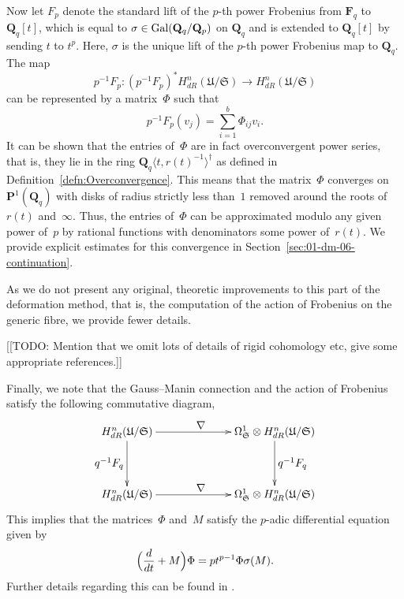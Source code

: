 Now let $F_p$ denote the standard lift of the $p$-th power Frobenius 
from $\mathbf{F}_q$ to $\mathbf{Q}_q[t]$, which is equal to 
$\sigma \in \operatorname{Gal}(\mathbf{Q}_q/\mathbf{Q}_p)$ on $\mathbf{Q}_q$ and 
is extended to $\mathbf{Q}_q[t]$ by sending $t$ to $t^p$.  Here, $\sigma$ 
is the unique lift of the $p$-th power Frobenius map to $\mathbf{Q}_q$.  
The map 
\begin{equation*}
p^{-1} F_p \colon (p^{-1} F_p)^{*} H_{dR}^{n}(\mathfrak{U}/\mathfrak{S}) 
    \to H_{dR}^{n}(\mathfrak{U}/\mathfrak{S})
\end{equation*}
can be represented by a matrix~$\Phi$ such that 
\begin{equation*}
p^{-1} F_p (v_j) = \sum_{i=1}^{b} \Phi_{ij} v_i.
\end{equation*}
It can be shown that the entries of~$\Phi$ are in fact overconvergent 
power series, that is, they lie in the ring 
$\mathbf{Q}_q\langle t, r(t)^{-1}\rangle^{\dagger}$ as defined in 
Definition~\ref{defn:Overconvergence}.  This means that the matrix~$\Phi$ 
converges on $\mathbf{P}^{1}(\mathbf{Q}_q)$ with disks of radius strictly 
less than~$1$ removed around the roots of $r(t)$ and~$\infty$.  Thus, the 
entries of~$\Phi$ can be approximated modulo any given power of~$p$ by 
rational functions with denominators some power of~$r(t)$.  We provide 
explicit estimates for this convergence in 
Section~\ref{sec:01-dm-06-continuation}.

As we do not present any original, theoretic improvements to this part of 
the deformation method, that is, the computation of the action of Frobenius 
on the generic fibre, we provide fewer details.

[[TODO:  Mention that we omit lots of details of rigid cohomology etc, 
give some appropriate references.]]

Finally, we note that the Gauss--Manin connection and the action of 
Frobenius satisfy the following commutative diagram,
\begin{equation*}
\def\labelstyle{\textstyle}
\xymatrix@C=6.8em@R=4em{
H_{dR}^{n}(\mathfrak{U}/\mathfrak{S}) \ar[d]_{q^{-1} F_q} \ar[r]^{\nabla} & 
\Omega_{\mathfrak{S}}^{1} \otimes H_{dR}^{n}(\mathfrak{U}/\mathfrak{S}) \ar[d]^{q^{-1} F_q} \\
H_{dR}^{n}(\mathfrak{U}/\mathfrak{S}) \ar[r]^{\nabla} & 
\Omega_{\mathfrak{S}}^{1} \otimes H_{dR}^{n}(\mathfrak{U}/\mathfrak{S}) 
}
\end{equation*}
This implies that the matrices~$\Phi$ and~$M$ satisfy the $p$-adic 
differential equation given by 
\begin{equation*}
\Bigl( \frac{d}{dt} + M \Bigr) \Phi = p t^{p-1} \Phi \sigma(M).
\end{equation*}
Further details regarding this can be found in \citep[\S 5]{Gerkmann2007}.


